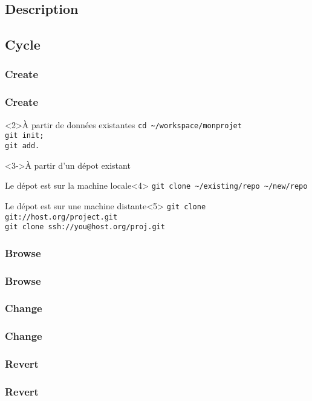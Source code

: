 \subsection{Description}
\subsection{Cycle}
	\subsubsection{Create}
		\begin{frame}[fragile]
			\frametitle{Create}
			\begin{block}<2>{À partir de données existantes}
				\verb'cd ~/workspace/monprojet'\\
				\verb'git init;'\\
				\verb'git add.'
			\end{block}
			\begin{block}<3->{À partir d'un dépot existant}
				\begin{exampleblock}{Le dépot est sur la machine locale}<4>
					\verb'git clone ~/existing/repo ~/new/repo'\\
				\end{exampleblock}

				\begin{exampleblock}{Le dépot est sur une machine distante}<5>
					\verb'git clone git://host.org/project.git'\\
					\verb'git clone ssh://you@host.org/proj.git'
				\end{exampleblock}
			\end{block}

		\end{frame}
	\subsubsection{Browse}
		\begin{frame}
			\frametitle{Browse}
		\end{frame}
	\subsubsection{Change}
		\begin{frame}
			\frametitle{Change}
		\end{frame}
	\subsubsection{Revert}
		\begin{frame}
			\frametitle{Revert}
		\end{frame}
